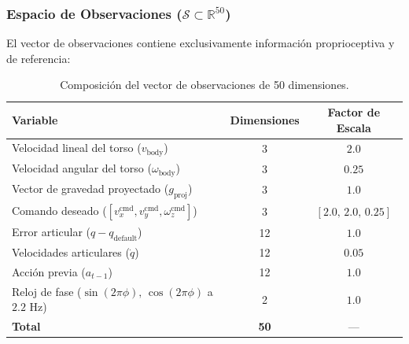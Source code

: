\documentclass[12pt,a4paper]{article}
\begin{document}
\subsubsection{Espacio de Observaciones ($\mathcal{S} \subset \mathbb{R}^{50}$)}
El vector de observaciones contiene exclusivamente información proprioceptiva y de referencia:
\begin{table}[H]
\centering
\caption{Composición del vector de observaciones de 50 dimensiones.}
\label{tab:obs}
\begin{tabular}{@{}lcc@{}}
\toprule
\textbf{Variable} & \textbf{Dimensiones} & \textbf{Factor de Escala} \\ \midrule
Velocidad lineal del torso ($v_{\text{body}}$) & 3 & $2.0$ \\
Velocidad angular del torso ($\omega_{\text{body}}$) & 3 & $0.25$ \\
Vector de gravedad proyectado ($g_{\text{proj}}$) & 3 & $1.0$ \\
Comando deseado ($[v_x^{\text{cmd}}, v_y^{\text{cmd}}, \omega_z^{\text{cmd}}]$) & 3 & $[2.0,\, 2.0,\, 0.25]$ \\
Error articular ($q - q_{\text{default}}$) & 12 & $1.0$ \\
Velocidades articulares ($\dot{q}$) & 12 & $0.05$ \\
Acción previa ($a_{t-1}$) & 12 & $1.0$ \\
Reloj de fase ($\sin(2\pi\phi),\, \cos(2\pi\phi)$ a $2.2\text{ Hz}$) & 2 & $1.0$ \\ \midrule
\textbf{Total} & \textbf{50} & --- \\ \bottomrule
\end{tabular}
\end{table}
\end{document}
